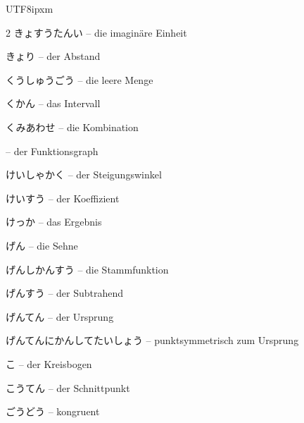 \begin{CJK}{UTF8}{ipxm}
\begin{multicols}{2}
 {\footnotesize\color{black!70}きょすうたんい} -- die imaginäre Einheit\dotfill\hyperref[e:11]{\pageref*{e:11}}\par
{} {\footnotesize\color{black!70}きょり} -- der Abstand\dotfill\hyperref[e:152]{\pageref*{e:152}}\par
{} {\footnotesize\color{black!70}くうしゅうごう} -- die leere Menge\dotfill\hyperref[e:104]{\pageref*{e:104}}\par
{} {\footnotesize\color{black!70}くかん} -- das Intervall\dotfill\hyperref[e:270]{\pageref*{e:270}}\par
{} {\footnotesize\color{black!70}くみあわせ} -- die Kombination\dotfill\hyperref[e:343]{\pageref*{e:343}}\par
{} -- der Funktionsgraph\dotfill\hyperref[e:111]{\pageref*{e:111}}\par
{} {\footnotesize\color{black!70}けいしゃかく} -- der Steigungswinkel\dotfill\hyperref[e:310]{\pageref*{e:310}}\par
{} {\footnotesize\color{black!70}けいすう} -- der Koeffizient\dotfill\hyperref[e:74]{\pageref*{e:74}}\par
{} {\footnotesize\color{black!70}けっか} -- das Ergebnis\dotfill\hyperref[e:327]{\pageref*{e:327}}\par
{} {\footnotesize\color{black!70}げん} -- die Sehne\dotfill\hyperref[e:218]{\pageref*{e:218}}\par
{} {\footnotesize\color{black!70}げんしかんすう} -- die Stammfunktion\dotfill\hyperref[e:285]{\pageref*{e:285}}\par
{} {\footnotesize\color{black!70}げんすう} -- der Subtrahend\dotfill\hyperref[e:20]{\pageref*{e:20}}\par
{} {\footnotesize\color{black!70}げんてん} -- der Ursprung\dotfill\hyperref[e:115]{\pageref*{e:115}}\par
{} {\footnotesize\color{black!70}げんてんにかんしてたいしょう} -- punktsymmetrisch zum Ursprung\dotfill\hyperref[e:145]{\pageref*{e:145}}\par
{} {\footnotesize\color{black!70}こ} -- der Kreisbogen\dotfill\hyperref[e:221]{\pageref*{e:221}}\par
{} {\footnotesize\color{black!70}こうてん} -- der Schnittpunkt\dotfill\hyperref[e:123]{\pageref*{e:123}}\par
{} {\footnotesize\color{black!70}ごうどう} -- kongruent\dotfill\hyperref[e:175]{\pageref*{e:175}}\par

\end{multicols}
\end{CJK}
